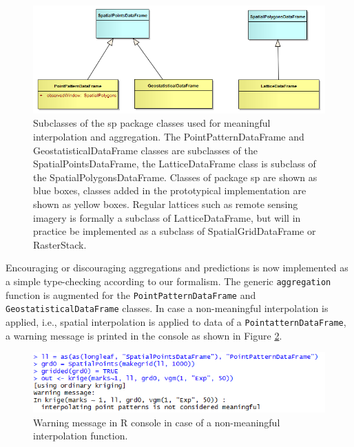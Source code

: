 \documentclass[final,authoryear,1p,times]{elsarticle}
\begin{document}
\begin{figure}[ht]
	\centering
		\includegraphics[scale=0.7]{imp_subclasses.png}
	\caption{Subclasses of the sp package classes used for meaningful interpolation and aggregation. The PointPatternDataFrame and GeostatisticalDataFrame classes are subclasses of the SpatialPointsDataFrame, the LatticeDataFrame class is subclass of the SpatialPolygonsDataFrame. Classes of package sp are shown as blue boxes, classes added in the prototypical implementation are shown as yellow boxes. Regular lattices such as remote sensing imagery is formally a subclass of LatticeDataFrame, but will in practice be implemented as a subclass of SpatialGridDataFrame or RasterStack.}
	\label{fig:subclassesR}
\end{figure}

Encouraging or discouraging aggregations and predictions is now implemented as a simple type-checking according to our formalism. The generic \lstinline|aggregation| function is augmented for the \lstinline|PointPatternDataFrame| and \lstinline|GeostatisticalDataFrame| classes. In case a non-meaningful interpolation is applied, i.e., spatial interpolation is applied to data of a \lstinline|PointatternDataFrame|, a warning message is printed in the console as shown in Figure \ref{fig:aggWarning}. 

\begin{figure}[ht]
	\centering
		\includegraphics[scale=0.6]{warningMessage.png}
	\caption{Warning message in R console in case of a non-meaningful interpolation function.}
	\label{fig:aggWarning}
\end{figure}
\end{document}
